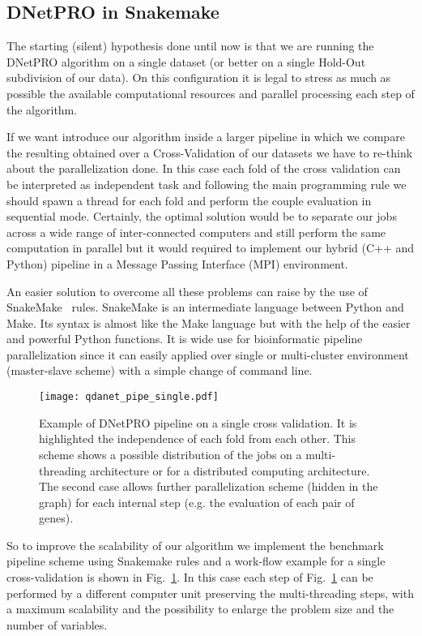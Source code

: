 \documentclass{standalone}
\begin{document}
\subsection[Pipeline]{DNetPRO in Snakemake}\label{implementation:snakemake}

The starting (silent) hypothesis done until now is that we are running the DNetPRO algorithm on a single dataset (or better on a single Hold-Out subdivision of our data).
On this configuration it is legal to stress as much as possible the available computational resources and parallel processing each step of the algorithm.

If we want introduce our algorithm inside a larger pipeline in which we compare the resulting obtained over a Cross-Validation of our datasets we have to re-think about the parallelization done.
In this case each fold of the cross validation can be interpreted as independent task and following the main programming rule \emph{} we should spawn a thread for each fold and perform the couple evaluation in sequential mode.
Certainly, the optimal solution would be to separate our jobs across a wide range of inter-connected computers and still perform the same computation in parallel but it would required to implement our hybrid (C++ and Python) pipeline in a Message Passing Interface (MPI) environment.

An easier solution to overcome all these problems can raise by the use of \textsf{SnakeMake}~\cite{snakemake} rules.
SnakeMake is an intermediate language between Python and Make.
Its syntax is almost like the Make language but with the help of the easier and powerful Python functions.
It is wide use for bioinformatic pipeline parallelization since it can easily applied over single or multi-cluster environment (master-slave scheme) with a simple change of command line.

\begin{center}
\begin{figure}[htbp]
\hspace{-2cm}
\texttt{[image: qdanet\_pipe\_single.pdf]}
\caption{Example of DNetPRO pipeline on a single cross validation.
It is highlighted the independence of each fold from each other.
This scheme shows a possible distribution of the jobs on a multi-threading architecture or for a distributed computing architecture.
The second case allows further parallelization scheme (hidden in the graph) for each internal step (e.g. the evaluation of each pair of genes).
}
\label{fig:dnet_workflow}
\end{figure}
\end{center}

So to improve the scalability of our algorithm we implement the benchmark pipeline scheme using Snakemake rules and a work-flow example for a single cross-validation is shown in Fig.~\ref{fig:dnet_workflow}.
In this case each step of Fig.~\ref{fig:dnet_workflow} can be performed by a different computer unit preserving the multi-threading steps, with a maximum scalability and the possibility to enlarge the problem size and the number of variables.
\end{document}
